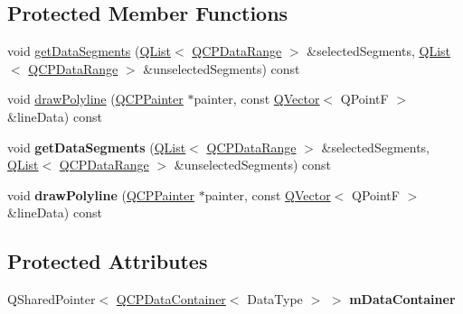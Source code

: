 \subsection*{Protected Member Functions}
\begin{DoxyCompactItemize}
\item 
void \hyperlink{class_q_c_p_abstract_plottable1_d_a966cb165fb1dfc561d923dc6f8b149ea}{get\+Data\+Segments} (\hyperlink{class_q_list}{Q\+List}$<$ \hyperlink{class_q_c_p_data_range}{Q\+C\+P\+Data\+Range} $>$ \&selected\+Segments, \hyperlink{class_q_list}{Q\+List}$<$ \hyperlink{class_q_c_p_data_range}{Q\+C\+P\+Data\+Range} $>$ \&unselected\+Segments) const 
\item 
void \hyperlink{class_q_c_p_abstract_plottable1_d_afcc3d512b172721356003a318e0e4c88}{draw\+Polyline} (\hyperlink{class_q_c_p_painter}{Q\+C\+P\+Painter} $\ast$painter, const \hyperlink{class_q_vector}{Q\+Vector}$<$ Q\+PointF $>$ \&line\+Data) const 
\item 
void {\bfseries get\+Data\+Segments} (\hyperlink{class_q_list}{Q\+List}$<$ \hyperlink{class_q_c_p_data_range}{Q\+C\+P\+Data\+Range} $>$ \&selected\+Segments, \hyperlink{class_q_list}{Q\+List}$<$ \hyperlink{class_q_c_p_data_range}{Q\+C\+P\+Data\+Range} $>$ \&unselected\+Segments) const \hypertarget{class_q_c_p_abstract_plottable1_d_a966cb165fb1dfc561d923dc6f8b149ea}{}\label{class_q_c_p_abstract_plottable1_d_a966cb165fb1dfc561d923dc6f8b149ea}

\item 
void {\bfseries draw\+Polyline} (\hyperlink{class_q_c_p_painter}{Q\+C\+P\+Painter} $\ast$painter, const \hyperlink{class_q_vector}{Q\+Vector}$<$ Q\+PointF $>$ \&line\+Data) const \hypertarget{class_q_c_p_abstract_plottable1_d_afcc3d512b172721356003a318e0e4c88}{}\label{class_q_c_p_abstract_plottable1_d_afcc3d512b172721356003a318e0e4c88}

\end{DoxyCompactItemize}
\subsection*{Protected Attributes}
\begin{DoxyCompactItemize}
\item 
Q\+Shared\+Pointer$<$ \hyperlink{class_q_c_p_data_container}{Q\+C\+P\+Data\+Container}$<$ Data\+Type $>$ $>$ {\bfseries m\+Data\+Container}\hypertarget{class_q_c_p_abstract_plottable1_d_a89a06f41fc3118e9986a6ec698e6dc95}{}\label{class_q_c_p_abstract_plottable1_d_a89a06f41fc3118e9986a6ec698e6dc95}

\end{DoxyCompactItemize}
